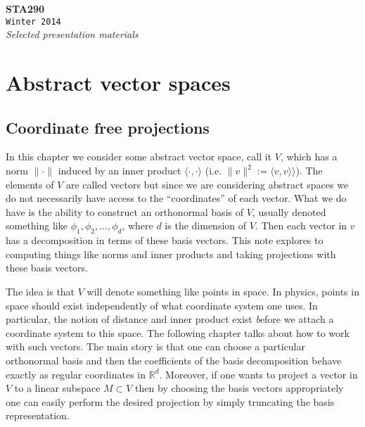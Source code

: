 \documentclass[11pt]{report}
\newcommand{\newchapter}[2]{
	\chapter{#1}
	\addtocontents{toc}{\vspace{.1in} \hspace{.25in} $\cdot$ #2 \par}
}
\newcommand*{\titleTH}{\begingroup %
	\center
	\vspace*{\baselineskip} %
	\vspace{2.5in}
	{\Huge\bfseries STA290}\\[\baselineskip] %
	{\Huge\texttt{Winter 2014}}\\[\baselineskip] %
	{\Large \textit{Selected presentation materials}}\par %
	\vspace*{3\baselineskip} %
\endgroup}
\begin{document}
\titleTH %
\thispagestyle{empty}
\tableofcontents




\chapter{Abstract vector spaces}

\section{Coordinate free projections}


In this chapter we consider some abstract vector space, call it $V$, which has a norm $\|\cdot \|$ induced by an inner product $\langle \cdot, \cdot \rangle$ (i.e. $\|v\|^2 := \langle v, v\rangle\rangle$). The elements of $V$ are called vectors but since we are considering abstract spaces we do not necessarily have access to the ``coordinates'' of each vector. What we do have is the ability to construct an orthonormal basis of $V$, usually denoted something like $\phi_1,\phi_2, \ldots, \phi_d$, where $d$ is the dimension of $V$. Then each vector in $v$ has a decomposition in terms of these basis vectors. This note explores to computing things like norms and inner products and taking projections with these basis vectors. 



The idea is that $V$ will denote something like points in space. In physics, points in space should exist independently of what coordinate system one uses. In particular, the notion of distance and inner product exist {\emph before} we attach a coordinate system to this space. The following chapter talks about how to work with such vectors. The main story is that one can choose a particular orthonormal basis and then the coefficients of the basis decomposition behave exactly as regular coordinates in $\mathbb{ R}^d$. Moreover, if one wants to project a vector in $V$ to a linear subspace $M\subset V$ then by choosing the basis vectors appropriately one can easily perform the desired projection by simply truncating the basis representation.
\end{document}
